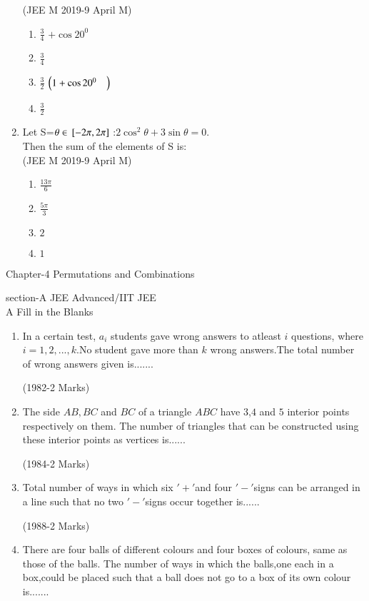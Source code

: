 \documentclass[journal,10pt,twocolumn]{IEEEtran}
\theoremstyle{remark}
\begin{document}
\begin{enumerate}[start=14]
\hfill {(JEE M 2019-9 April M)}\\
\begin{enumerate}
\item $\frac{3}{4}$ $+\cos20^0$
\item $\frac{3}{4}$\\
 \item $\frac{3}{2}$ $\left(1+\cos20^0\quad\right)$ 
 \item $\frac{3}{2}$\\
 \end{enumerate}
\item Let S=$\theta \in {}\left[-2\pi, 2\pi\right]$ :$2\cos^2\theta + 3\sin\theta=0.$\\
 Then the sum of the elements of S is:\\
 
\hfill {(JEE M 2019-9 April M)}\\
\begin{enumerate}
\item $\frac{13\pi}{6}$ 
\item $\frac{5\pi}{3}$
 \item $2$
 \item $1$\\
\end{enumerate} 
\end{enumerate}
\begin{center}
Chapter-4 Permutations and Combinations 
\end{center}
section-A JEE Advanced/IIT JEE   
\\
A Fill in the Blanks\\

\begin{enumerate}
\item In a certain test, $a_i$ students gave wrong answers to atleast 
 $i$ questions, where $i=1,2,...,k.$No student gave more than 
 $k$ wrong answers.The total number of wrong answers
 given is.......
 
\hfill {(1982-2 Marks)} \\

\item The side $AB,BC$ and $BC$ of a triangle $ABC$ have $3$,$4$ and $5$ 
 interior points respectively on them. The number of triangles
 that can be constructed using these interior points as
 vertices is......
 
\hfill {(1984-2 Marks)} \\

\item Total number of ways in which six $'+'$and four $'-'$signs can
 be arranged in a line such that no two $'-'$signs occur together
 is......
 
\hfill  {(1988-2 Marks)} \\

\item There are four balls of different colours and four boxes of
 colours, same as those of the balls. The number of ways in
 which the balls,one each in a box,could be placed such that
 a ball does not go to a box of its own colour is.......\\
\\
\end{enumerate} 
\end{document}
